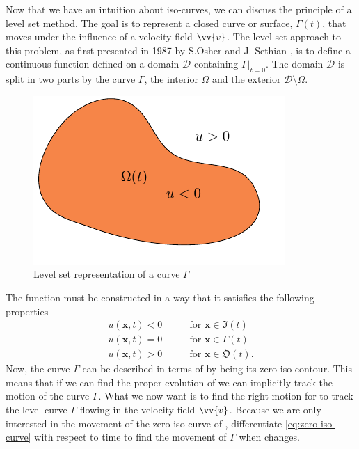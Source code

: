 Now that we have an intuition about iso-curves, we can discuss the principle
of a level set method. The goal is to represent a closed curve or surface, 
$\Gamma(t)$, that moves under the influence of a velocity field $\vv{v}$.
The level set approach to this problem, as first presented in 1987 by 
S.Osher and J. Sethian \cite{MR965860}, is to define a continuous function
\uxt defined on a domain $\mathcal{D}$ containing $\Gamma|_{t=0}$.
The domain $\mathcal{D}$ is split in two parts by the curve $\Gamma$, the interior
$\Omega$ and the exterior $\mathcal{D} \setminus \Omega$. 
\begin{figure}
    \centering
    \includegraphics[width=.7\linewidth]{figures/tikz-figures/optimization-problem.pdf}
    \caption{Level set representation of a curve $\Gamma$}
    \label{fig:levelset-representation}
\end{figure}
The function \uxt must be constructed in a way that it satisfies the following properties
\begin{align}
    u(\mathbf{x}, t) < 0 \qquad &\text{for } \mathbf{x} \in  \mathfrak{I}(t) \label{eq:interior}\\
    u(\mathbf{x}, t) = 0 \qquad &\text{for } \mathbf{x} \in  \Gamma(t) \label{eq:zero-iso-curve}\\
    u(\mathbf{x}, t) > 0 \qquad &\text{for } \mathbf{x} \in  \mathfrak{O}(t) \label{eq:exterior}.
\end{align}
Now, the curve $\Gamma$ can be described in terms of \uxt by being its 
zero iso-contour. This means that if we can find the proper evolution of 
\uxt we can implicitly track the motion of the curve $\Gamma$.
What we now want is to find the right motion for \uxt to
track the level curve $\Gamma$ flowing in the velocity field $\vv{v}$. Because
we are only interested in the movement of the zero iso-curve of \uxt,
differentiate \eqref{eq:zero-iso-curve} with respect to time to find the movement
of $\Gamma$ when \uxt changes.
